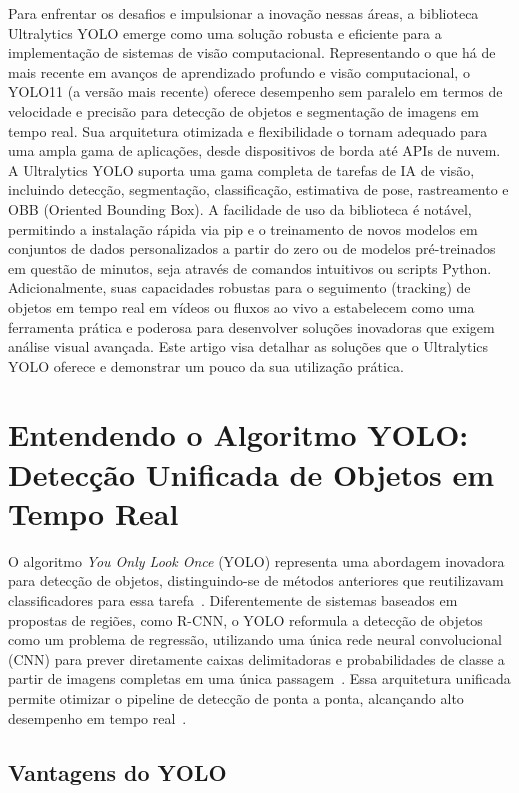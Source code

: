 \documentclass[journal,transmag]{IEEEtran}
\begin{document}
Para enfrentar os desafios e impulsionar a inovação nessas áreas, a biblioteca Ultralytics YOLO emerge como uma solução robusta e eficiente para a implementação de sistemas de visão computacional. Representando o que há de mais recente em avanços de aprendizado profundo e visão computacional, o YOLO11 (a versão mais recente) oferece desempenho sem paralelo em termos de velocidade e precisão para detecção de objetos e segmentação de imagens em tempo real. Sua arquitetura otimizada e flexibilidade o tornam adequado para uma ampla gama de aplicações, desde dispositivos de borda até APIs de nuvem. A Ultralytics YOLO suporta uma gama completa de tarefas de IA de visão, incluindo detecção, segmentação, classificação, estimativa de pose, rastreamento e OBB (Oriented Bounding Box). A facilidade de uso da biblioteca é notável, permitindo a instalação rápida via pip e o treinamento de novos modelos em conjuntos de dados personalizados a partir do zero ou de modelos pré-treinados em questão de minutos, seja através de comandos intuitivos ou scripts Python. Adicionalmente, suas capacidades robustas para o seguimento (tracking) de objetos em tempo real em vídeos ou fluxos ao vivo a estabelecem como uma ferramenta prática e poderosa para desenvolver soluções inovadoras que exigem análise visual avançada. Este artigo visa detalhar as soluções que o Ultralytics YOLO oferece e demonstrar um pouco da sua utilização prática.
%

\section{Entendendo o Algoritmo YOLO: Detecção Unificada de Objetos em Tempo Real}

O algoritmo \textit{You Only Look Once} (YOLO) representa uma abordagem inovadora para detecção de objetos, distinguindo-se de métodos anteriores que reutilizavam classificadores para essa tarefa~\cite{Redmon2015}. Diferentemente de sistemas baseados em propostas de regiões, como R-CNN, o YOLO reformula a detecção de objetos como um problema de regressão, utilizando uma única rede neural convolucional (CNN) para prever diretamente caixas delimitadoras e probabilidades de classe a partir de imagens completas em uma única passagem~\cite{Redmon2015}. Essa arquitetura unificada permite otimizar o pipeline de detecção de ponta a ponta, alcançando alto desempenho em tempo real~\cite{Redmon2015}.

\subsection{Vantagens do YOLO}
\end{document}
